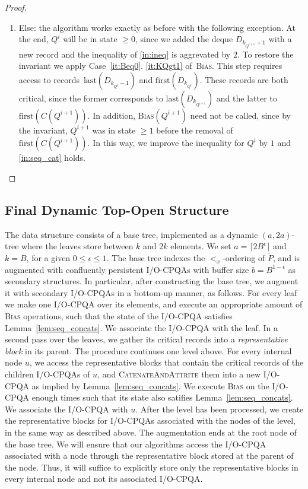 \documentclass{sig-alternate}
\newcommand{\first}{\text{first}}
\newcommand{\last}{\text{last}}
\newcommand{\iref}[1]{\ref{#1}} \newcommand{\attr}[1]{\widetilde{#1}}
\renewcommand{\(}{\left(}
\renewcommand{\)}{\right)}
\begin{document}
\begin{fullenv}
\begin{proof}
\begin{enumerate}
  \item Else: the algorithm works exactly as before with the following
    exception. At the end, $Q^i$ will be in state $\geq 0$, since we added the
    deque $D_{k_{Q^{i+1}}+1}$ with a new record and the inequality of
    \iref{in:ineq} is aggrevated by $2$. To restore the invariant we apply
    Case~\ref{it:Beq0}.  \ref{it:KQgt1} of~\textsc{Bias}. This step requires
    access to records~$\last(D_{k_{Q^i}-1})$ and $\first (D_{k_{Q^i}})$. These
    records are both critical, since the former corresponds to $\last
    (D_{k_{Q^{i+1}}})$ and the latter to $\first(C(Q^{i+1}))$. In addition,
    \textsc{Bias}$(Q^{i+1})$ need not be called, since by the invariant,
    $Q^{i+1}$ was in state $\geq 1$ before the removal of $\first(C(Q^{i+1}))$.
    In this way, we improve the inequality for $Q^i$ by $1$ and
    \iref{in:seq_cat} holds. 
\end{enumerate}
\end{proof}
\end{fullenv}

\subsection{Final Dynamic Top-Open Structure} \label{sec:skyline}


The data structure consists of a base tree, implemented as a dynamic $(a,
2a)$-tree where the leaves store between $k$ and $2k$ elements. We set $a=\lceil
2B^\epsilon\rceil$ and $k=B$, for a given $0 \leq \epsilon \leq 1$.  The base
tree indexes the $<_x$-ordering of $\attr{P}$, and is augmented with confluently
persistent I/O-CPQAs with buffer size $b=B^{1-\epsilon}$ as secondary
structures. In particular, after constructing the base tree, we augment it with
secondary I/O-CPQAs in a bottom-up manner, as follows. For every leaf we make
one I/O-CPQA over its elements, and execute an appropriate amount of
\textsc{Bias} operations, such that the state of the I/O-CPQA satisfies
Lemma~\ref{lem:seq_concats}. We associate the I/O-CPQA with the leaf.  In a
second pass over the leaves, we gather its critical records into a
\textit{representative block} in its parent. The procedure continues one level
above. For every internal node $u$, we access the representative blocks that
contain the critical records of the children I/O-CPQAs of $u$, and
\textsc{CatenateAndAttrite} them into a new I/O-CPQA as implied by
Lemma~\ref{lem:seq_concats}. We execute \textsc{Bias} on the I/O-CPQA enough
times such that its state also satifies Lemma~\ref{lem:seq_concats}.  We
associate the I/O-CPQA with $u$. After the level has been processed, we create
the representative blocks for I/O-CPQAs associated with the nodes of the level,
in the same way as described above. The augmentation ends at the root node of
the base tree. We will ensure that our algorithms access the I/O-CPQA associated
with a node through the representative block stored at the parent of the node.
Thus, it will suffice to explicitly store only the representative blocks in
every internal node and not its associated I/O-CPQA.
\end{document}

